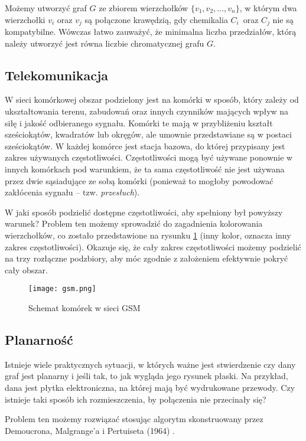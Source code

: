 Możemy utworzyć graf $G$ ze zbiorem wierzchołków $\{v_1,v_2,\ldots,v_n\}$, w którym dwa wierzchołki $v_i$ oraz $v_j$ są połączone krawędzią, gdy chemikalia $C_i$~oraz $C_j$ nie są kompatybilne. Wówczas łatwo zauważyć, że minimalna liczba przedziałów, którą należy utworzyć jest równa liczbie chromatycznej grafu $G$. 


\subsection*{Telekomunikacja}

W sieci komórkowej obszar podzielony jest na komórki w sposób, który zależy od  ukształtowania terenu, zabudowań oraz innych czynników mających wpływ na siłę i jakość odbieranego sygnału. Komórki te mają w przybliżeniu kształt sześciokątów, kwadratów lub okręgów, ale umownie przedstawiane są w postaci sześciokątów. W każdej komórce jest stacja bazowa, do której przypisany jest zakres używanych częstotliwości. Częstotliwości mogą być używane ponownie w innych komórkach pod warunkiem, że ta sama częstotliwość nie jest używana przez dwie sąsiadujące ze sobą komórki (ponieważ to mogłoby powodować zakłócenia sygnału -- tzw. \emph{przesłuch}).

W jaki sposób podzielić dostępne częstotliwości, aby spełniony był powyższy warunek? Problem ten możemy sprowadzić do zagadnienia kolorowania wierzchołków, co zostało przedstawione na rysunku \ref{fig:gsm} (inny kolor, oznacza inny zakres częstotliwości). Okazuje się, że cały zakres częstotliwości możemy podzielić na trzy rozłączne podzbiory, aby móc zgodnie z założeniem efektywnie pokryć cały obszar. 

\bigskip 
\begin{figure}[H]
\centering
\texttt{[image: gsm.png]}
\caption{Schemat komórek w sieci GSM}\label{fig:gsm}
\end{figure}
\bigskip 

\subsection*{Planarność}

Istnieje wiele praktycznych sytuacji, w których ważne jest stwierdzenie czy dany graf jest planarny i jeśli tak, to jak wygląda jego rysunek płaski. Na przykład, dana jest płytka elektroniczna, na której mają być wydrukowane przewody. Czy istnieje taki sposób ich rozmieszczenia, by połączenia nie przecinały się?

Problem ten możemy rozwiązać stosując algorytm skonstruowany przez Demoucrona, Malgrange'a i Pertuiseta (1964) \cite[163]{bondy}.

